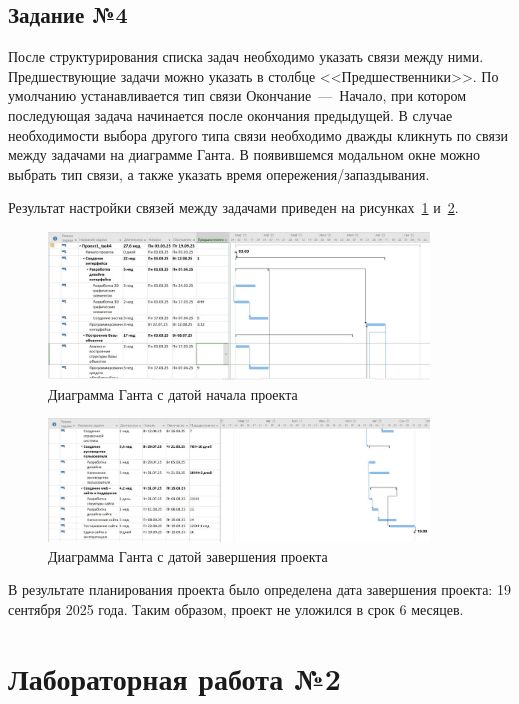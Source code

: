 \subsection{Задание №4}

После структурирования списка задач необходимо указать связи между ними. 
Предшествующие задачи можно указать в столбце <<Предшественники>>.
По умолчанию устанавливается тип связи Окончание~---~Начало, при котором последующая задача начинается после окончания предыдущей.
В случае необходимости выбора другого типа связи необходимо дважды кликнуть по связи между задачами на диаграмме Ганта.
В появившемся модальном окне можно выбрать тип связи, а также указать время опережения/запаздывания.

Результат настройки связей между задачами приведен на рисунках~\ref{fig:task41} и~\ref{fig:task42}.

\begin{figure}[H]
	\centering
	\includegraphics[width=0.9\textwidth]{img/lab1/task4/task4.jpg}
	\caption{Диаграмма Ганта с датой начала проекта}
	\label{fig:task41}
\end{figure}

\begin{figure}[H]
	\centering
	\includegraphics[width=0.9\textwidth]{img/lab1/task4/task4_1.jpg}
	\caption{Диаграмма Ганта с датой завершения проекта}
	\label{fig:task42}
\end{figure}

В результате планирования проекта было определена дата завершения проекта: 19 сентября 2025 года.
Таким образом, проект не уложился в срок 6 месяцев.

\section{Лабораторная работа №2}

